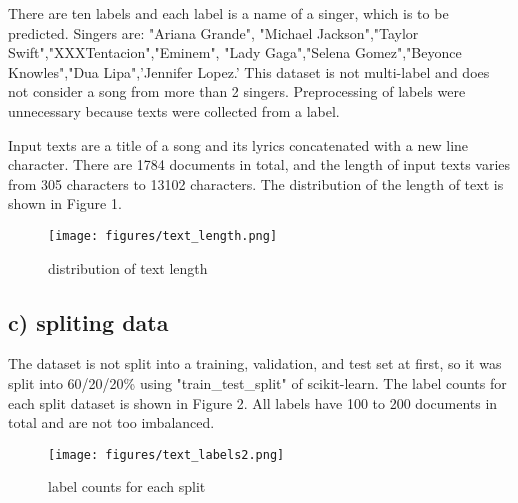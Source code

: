 \documentclass[a4paper,11pt]{article}
\begin{document}
There are ten labels and each label is a name of a singer, which is to be predicted.
Singers are: "Ariana Grande", "Michael Jackson","Taylor Swift","XXXTentacion","Eminem", "Lady Gaga","Selena Gomez","Beyonce Knowles","Dua Lipa",'Jennifer Lopez.'
This dataset is not multi-label and does not consider a song from more than 2 singers.
Preprocessing of labels were unnecessary because texts were collected from a label.


Input texts are a title of a song and its lyrics concatenated with a new line character.
There are 1784 documents in total, 
and the length of input texts varies from 305 characters to 13102 characters.
The distribution of the length of text is shown in Figure 1.
\begin{figure}[htbp]
  \begin{center}
  \texttt{[image: figures/text\_length.png]}
  \caption{distribution of text length}
  \end{center}
\end{figure}



\subsection{c) spliting data}
The dataset is not split into a training, validation, and test set at first, 
so it was split into 60/20/20\% using "train\_test\_split" of scikit-learn.
The label counts for each split dataset is shown in Figure 2.
All labels have 100 to 200 documents in total and are not too imbalanced.



\begin{figure}[htbp]
  \begin{center}
  \texttt{[image: figures/text\_labels2.png]}
  \caption{label counts for each split}
  \end{center}
\end{figure}

\end{document}

